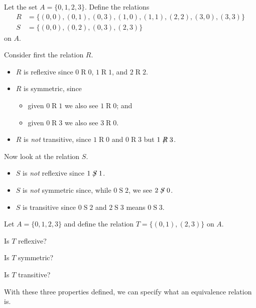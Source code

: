 \begin{example}
    Let the set $A = \{0,1,2,3\}$. Define the relations
    \begin{align*}
        R &= \{(0,0),(0,1),(0,3),(1,0),(1,1),(2,2),(3,0),(3,3)\}\\
        S &= \{(0,0),(0,2),(0,3),(2,3)\}
    \end{align*}
    on $A$.
    
    Consider first the relation $R$.
    \begin{itemize}
        \item $R$ is reflexive since $0\mathrel{R}0$, $1\mathrel{R}1$, and $2\mathrel{R}2$.
        \item $R$ is symmetric, since
        \begin{itemize}
            \item given $0\mathrel{R}1$ we also see $1\mathrel{R}0$; and
            \item given $0\mathrel{R}3$ we also see $3\mathrel{R}0$.
        \end{itemize}
        \item $R$ is \textit{not} transitive, since $1\mathrel{R}0$ and $0\mathrel{R}3$ but $1\not\mathrel{R}3$.
    \end{itemize}

    Now look at the relation $S$.
    \begin{itemize}
        \item $S$ is \textit{not} reflexive since $1\not\mathrel{S}1$.
        \item $S$ is \textit{not} symmetric since, while $0\mathrel{S}2$, we see $2\not\mathrel{S}0$.
        \item $S$ is transitive since $0\mathrel{S}2$ and $2\mathrel{S}3$ means $0\mathrel{S}3$.
    \end{itemize}
\end{example}

\begin{exercise}
    Let $A = \{0, 1, 2, 3\}$ and define the relation $T = \{(0, 1), (2, 3)\}$ on $A$.
    \begin{partquestions}{\alph*}
        \item Is $T$ reflexive?
        \item Is $T$ symmetric?
        \item Is $T$ transitive?
    \end{partquestions}
\end{exercise}

With these three properties defined, we can specify what an equivalence relation is.

